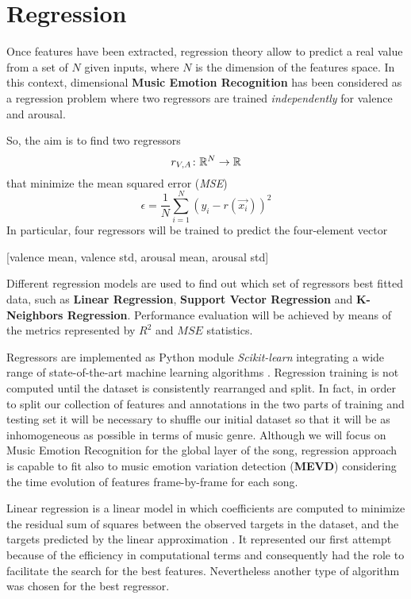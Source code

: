 \section{Regression} %
Once features have been extracted, regression theory allow to predict a real value from a set of $N$ given inputs, where $N$ is the dimension of the features space. In this context, dimensional \textbf{Music Emotion Recognition} has been considered as a regression problem where two regressors are trained \textit{independently} for valence and arousal. 

So, the aim is to find two regressors  
\[r_{V, A} \colon \mathbb{R}^{N} \to \mathbb{R}\]
that minimize the mean squared error (\textit{MSE})
\[ \epsilon = \frac{1}{N} \sum_{i =1}^{N} (y_i - r(\vec{x_i}))^2\]
In particular, four regressors will be trained to predict the four-element vector
\begin{center}
[valence mean, valence std, arousal mean, arousal std]
\end{center}

Different regression models are used to find out which set of regressors best fitted data, such as \textbf{Linear Regression}, \textbf{Support Vector Regression} and \textbf{K-Neighbors Regression}. Performance evaluation will be achieved by means of the metrics represented by $R^2$ and $MSE$ statistics.

Regressors are implemented as Python module \textit{Scikit-learn} integrating a wide range of state-of-the-art machine learning algorithms \cite{scikit-learn}. Regression training is not computed until the dataset is consistently rearranged and split. In fact, in order to split our collection of features and annotations in the two parts of training and testing set it will be necessary to shuffle our initial dataset so that it will be as inhomogeneous as possible in terms of music genre. Although we will focus on Music Emotion Recognition for the global layer of the song, regression approach is capable to fit also to music emotion variation detection (\textbf{MEVD}) considering the time evolution of features frame-by-frame for each song.

Linear regression is a linear model in which coefficients are computed to minimize the residual sum of squares between the observed targets in the dataset, and the targets predicted by the linear approximation \cite{scikit-learn}. It represented our first attempt because of the efficiency in computational terms and consequently had the role to facilitate the search for the best features. Nevertheless another type of algorithm was chosen for the best regressor.

